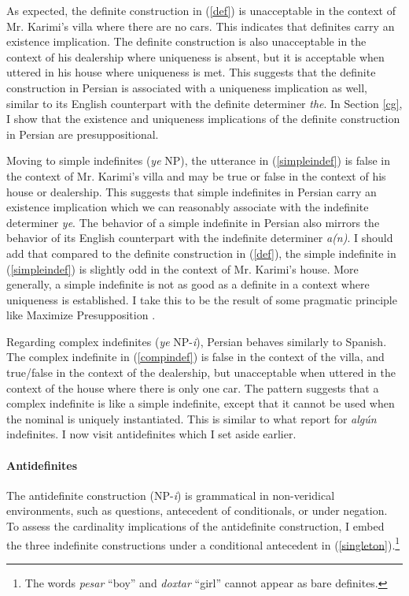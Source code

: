 \documentclass{salt}
\begin{document}
As expected, the definite construction in (\ref{def}) is unacceptable in the context of Mr. Karimi's villa where there are no cars. This indicates that definites carry an existence implication. The definite construction is also unacceptable in the context of his dealership where uniqueness is absent, but it is acceptable when uttered in his house where uniqueness is met. This suggests that the definite construction in Persian is associated with a uniqueness implication as well, similar to its English counterpart with the definite determiner \emph{the}. In Section \ref{cg}, I show that the existence and uniqueness implications of the definite construction in Persian are presuppositional.

Moving to simple indefinites (\emph{ye} NP), the utterance in (\ref{simpleindef}) is false in the context of Mr. Karimi's villa and may be true or false in the context of his house or dealership. This suggests that simple indefinites in Persian carry an existence implication which we can reasonably associate with the indefinite determiner \emph{ye}. The behavior of a simple indefinite in Persian also mirrors the behavior of its English counterpart with the indefinite determiner \emph{a(n)}. I should add that compared to the definite construction in (\ref{def}), the simple indefinite in (\ref{simpleindef}) is slightly odd in the context of Mr. Karimi's house. More generally, a simple indefinite is not as good as a definite in a context where uniqueness is established. I take this to be the result of some pragmatic principle like Maximize Presupposition \citep{heim1991artikel, schlenker2012maximize}.

Regarding complex indefinites (\emph{ye} NP-\emph{i}), Persian behaves similarly to Spanish. The complex indefinite in (\ref{compindef}) is false in the context of the villa, and true/false in the context of the dealership, but unacceptable when uttered in the context of the house where there is only one car. The pattern suggests that a complex indefinite is like a simple indefinite, except that it cannot be used when the nominal is uniquely instantiated. This is similar to what \cite{alonso2009modal} report for \emph{alg\'{u}n} indefinites. I now visit antidefinites which I set aside earlier.

\paragraph{Antidefinites} The antidefinite construction (NP-\emph{i}) is grammatical in non-veridical environments, such as questions, antecedent of conditionals, or under negation. To assess the cardinality implications of the antidefinite construction, I embed the three indefinite constructions under a conditional antecedent in (\ref{singleton}).\footnote{The words \emph{pesar} ``boy'' and \emph{doxtar} ``girl'' cannot appear as bare definites.}
\end{document}
